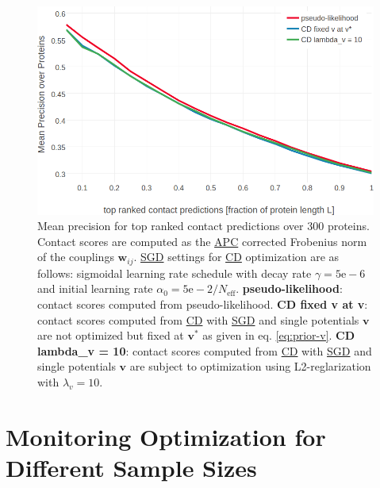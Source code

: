 \documentclass[11pt,a4paper,twoside]{book}
\newcommand{\eq}{\!=\!}
\renewcommand{\v}{\mathbf{v}}
\newcommand{\wij}{\mathbf{w}_{ij}}
\theoremstyle{definition}
\theoremstyle{definition}
\theoremstyle{remark}
\begin{document}
\begin{figure}

{\centering \includegraphics[width=1\linewidth]{img/full_likelihood/appendix/precision_vs_rank_fixed_v} 

}

\caption{Mean precision for top ranked
contact predictions over 300 proteins. Contact scores are computed as
the \protect\hyperlink{abbrev}{APC} corrected Frobenius norm of the
couplings \(\wij\). \protect\hyperlink{abbrev}{SGD} settings for
\protect\hyperlink{abbrev}{CD} optimization are as follows: sigmoidal
learning rate schedule with decay rate \(\gamma = \mathrm{5e-6}\) and
initial learning rate \(\alpha_0 \eq \mathrm{5e-2}/N_{\textrm{eff}}\).
\textbf{pseudo-likelihood}: contact scores computed from
pseudo-likelihood. \textbf{CD fixed v at v}: contact scores computed
from \protect\hyperlink{abbrev}{CD} with \protect\hyperlink{abbrev}{SGD}
and single potentials \(\v\) are not optimized but fixed at \(\v^*\) as
given in eq. \eqref{eq:prior-v}. \textbf{CD lambda\_v = 10}: contact
scores computed from \protect\hyperlink{abbrev}{CD} with
\protect\hyperlink{abbrev}{SGD} and single potentials \(\v\) are subject
to optimization using L2-reglarization with \(\lambda_v \eq 10\).}\label{fig:full-likelihood-opt-fixv}
\end{figure}

\section{Monitoring Optimization for Different Sample
Sizes}\label{monitoring-optimization-for-different-sample-sizes}
\end{document}
